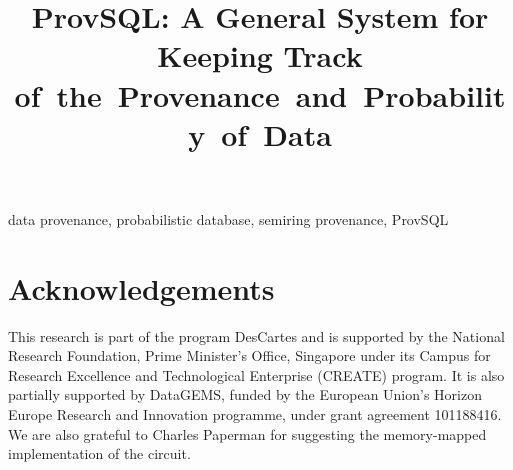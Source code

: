 \documentclass[conference]{IEEEtran}
\begin{document}
\title{ProvSQL: A General System for Keeping Track of~the~Provenance~and~Probability~of~Data}

\author{%
}

%

\maketitle



\begin{IEEEkeywords}
data provenance, probabilistic database, semiring provenance, ProvSQL
\end{IEEEkeywords}










\section*{Acknowledgements}
This research is part of the program DesCartes and is supported by the National Research Foundation, Prime Minister's Office, Singapore
 under its Campus for Research Excellence and Technological Enterprise
 (CREATE) program. It is also partially supported by DataGEMS, funded by
 the European Union's Horizon Europe Research and Innovation
 programme, under grant agreement 101188416.
 We are also grateful to Charles Paperman for suggesting the memory-mapped
 implementation of the circuit.

\clearpage



\end{document}
